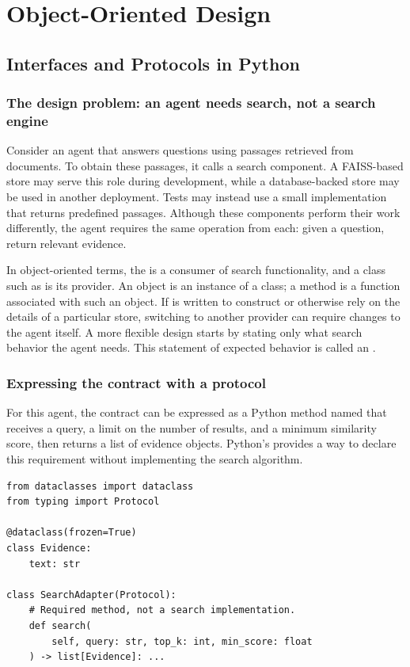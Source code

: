 \chapter{Object-Oriented Design}
\label{ch:object-oriented-design}
\section{Interfaces and Protocols in Python}
\label{sec:python-interfaces-protocols}
\subsection{The design problem: an agent needs search, not a search engine}
Consider an agent that answers questions using passages retrieved from documents. To obtain these passages, it calls a search component. A FAISS-based store may serve this role during development, while a database-backed store may be used in another deployment. Tests may instead use a small implementation that returns predefined passages. Although these components perform their work differently, the agent requires the same operation from each: given a question, return relevant evidence.

In object-oriented terms, the  is a consumer of search functionality, and a class such as  is its provider. An object is an instance of a class; a method is a function associated with such an object. If  is written to construct or otherwise rely on the details of a particular store, switching to another provider can require changes to the agent itself. A more flexible design starts by stating only what search behavior the agent needs. This statement of expected behavior is called an .

\subsection{Expressing the contract with a protocol}
For this agent, the contract can be expressed as a Python method named  that receives a query, a limit on the number of results, and a minimum similarity score, then returns a list of evidence objects. Python's  provides a way to declare this requirement without implementing the search algorithm.

\begin{lstlisting}[caption={Declaring the search interface with a Python protocol},label={lst:declaring-search-interface}]
from dataclasses import dataclass
from typing import Protocol

@dataclass(frozen=True)
class Evidence:
    text: str

class SearchAdapter(Protocol):
    # Required method, not a search implementation.
    def search(
        self, query: str, top_k: int, min_score: float
    ) -> list[Evidence]: ...
\end{lstlisting}

